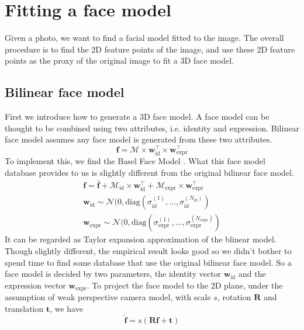 
\section{Fitting a face model}
Given a photo, we want to find a facial model fitted to the image. The overall procedure is to find the 2D feature points of the image, and use these 2D feature points as the proxy of the original image to fit a 3D face model.

\subsection{Bilinear face model}
First we introduce how to generate a 3D face model. A face model can be thought to be combined using two attributes, i.e. identity and expression. Bilinear face model \cite{vlasic2005face} assumes any face model is generated from these two attributes. 
$$\mathbf{f} = \mathcal{M} \times \mathbf{w}_{\text{id}}^\top \times \mathbf{w}_{\text{expr}}^\top$$
To implement this, we find the Basel Face Model \cite{gerig2017morphable}. What this face model database provides to us is slightly different from the original bilinear face model. 
\begin{align*}
\mathbf{f} = \bar{\mathbf{f}} + \mathcal{M}_{\text{id}} \times \mathbf{w}_{\text{id}}^\top + \mathcal{M}_{\text{expr}}\times \mathbf{w}_{\text{expr}}^\top \\
\mathbf{w}_{\text{id}} \sim \mathcal{N}(0, \text{diag}(\sigma_{\text{id}}^{(1)}, \dots, \sigma_{\text{id}}^{(N_\text{id})}) \\ 
\mathbf{w}_{\text{expr}} \sim \mathcal{N}(0, \text{diag}(\sigma_{\text{expr}}^{(1)}, \dots, \sigma_{\text{expr}}^{(N_\text{expr})})
\end{align*}
It can be regarded as Taylor expansion approximation of the blinear model. Though slightly different, the empirical result looks good so we didn't bother to spend time to find some database that use the original bilinear face model.
So a face model is decided by two parameters, the identity vector $\mathbf{w}_{\text{id}}$ and the expression vector $\mathbf{w}_{\text{expr}}$. To project the face model to the 2D plane, under the assumption of weak perspective camera model, with scale $s$, rotation $\mathbf{R}$ and translation $\mathbf{t}$, we have 
$$\hat{\mathbf{f}} = s (\mathbf{R} \mathbf{f} + \mathbf{t})$$

